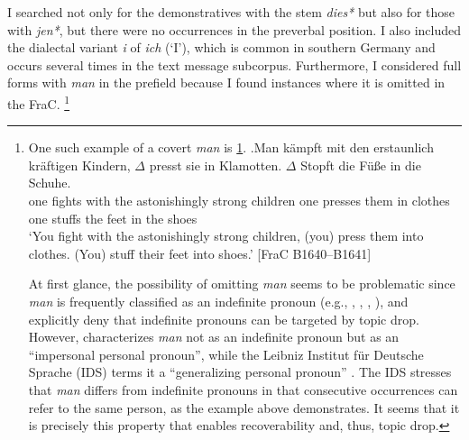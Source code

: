 \largerpage[-2]
\noindent
I searched not only for the demonstratives with the stem \textit{dies*} but also for those with \textit{jen*}, but there were no occurrences in the preverbal position.
I also included the dialectal variant \textit{i} of \textit{ich} (`I'), which is common in southern Germany and occurs several times in the text message subcorpus.
Furthermore, I considered full forms with \textit{man} in the prefield because I found instances where it is omitted in the FraC.%
\footnote{\label{note:man}
One such example of a covert \textit{man} is \ref{ex:man}.
\exg.\label{ex:man}Man kämpft mit den erstaunlich kräftigen Kindern, $\Delta$ presst sie in Klamotten. $\Delta$ Stopft die Füße in die Schuhe.\\
one fights with the astonishingly strong children one presses them in clothes one stuffs the feet in the shoes\\
`You fight with the astonishingly strong children, (you) press them into clothes. (You) stuff their feet into shoes.' [FraC B1640--B1641]

At first glance, the possibility of omitting \textit{man} seems to be problematic since \textit{man} is frequently classified as an indefinite pronoun (e.g., \cite[43]{zifonun.etal1997}, \cite[66--67]{gallmann.sitta2007}, \cite[87]{imo2016}, \cite[140--141]{thielmann2021}), and \citet{volodina.onea2012} explicitly deny that indefinite pronouns can be targeted by topic drop.
However, \citet[187]{eisenberg2020} characterizes \textit{man} not as an indefinite pronoun but as an ``impersonal personal pronoun'', while the Leibniz Institut für Deutsche Sprache (IDS) terms it a ``generalizing personal pronoun'' \citep{man}.
The IDS stresses that \textit{man} differs from indefinite pronouns in that consecutive occurrences can refer to the same person, as the example above demonstrates.
It seems that it is precisely this property that enables recoverability  and, thus, topic drop.}

